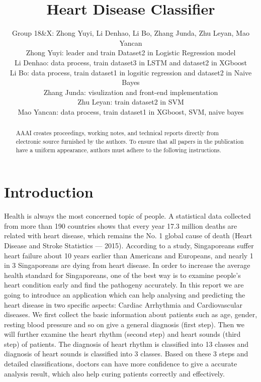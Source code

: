 \documentclass[letterpaper]{article} %
\begin{document}
%
\title{Heart Disease Classifier}
\author{Group 18\&X: Zhong Yuyi, Li Denhao, Li Bo, Zhang Junda, Zhu Leyan, Mao Yancan\\
Zhong Yuyi: leader and train Dataset2 in Logistic Regression model\\
Li Denhao: data process, train dataset3 in LSTM and dataset2 in XGboost\\
Li Bo: data process, train dataset1 in logsitic regression and dataset2 in Naive Bayes\\
Zhang Junda: visulization and front-end implementation\\
Zhu Leyan: train dataset2 in SVM \\
Mao Yancan: data process, train dataset1 in XGboost, SVM, naive bayes\\
}
\maketitle
\begin{abstract}
AAAI creates proceedings, working notes, and technical reports directly from electronic source furnished by the authors. To ensure that all papers in the publication have a uniform appearance, authors must adhere to the following instructions. 
\end{abstract}

\section{Introduction}
Health is always the most concerned topic of people. A statistical data collected from more than 190 countries shows that every year 17.3 million deaths are related with heart disease, which remains the No. 1 global cause of death (Heart Disease and Stroke Statistics — 2015). According to a study, Singaporeans suffer heart failure about 10 years earlier than Americans and Europeans, and nearly 1 in 3 Singaporeans are dying from heart disease. In order to increase the average health standard for Singaporeans, one of the best way is to examine people’s heart condition early and find the pathogeny accurately.
In this report we are going to introduce an application which can help analysing and predicting the heart disease in two specific aspects: Cardiac Arrhythmia and Cardiovascular diseases. We first collect the basic information about patients such as age, gender, resting blood pressure and so on give a general diagnosis (first step). Then we will further examine the heart rhythm (second step) and heart sounds (third step) of patients. The diagnosis of heart rhythm is classified into 13 classes and diagnosis of heart sounds is classified into 3 classes. Based on these 3 steps and detailed classifications, doctors can have more confidence to give a accurate analysis result, which also help curing patients correctly and effectively.
 
\end{document}
